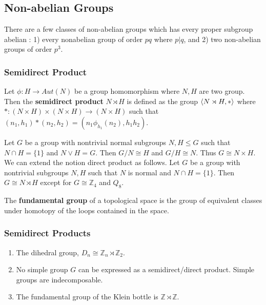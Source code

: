 \subsection{Non-abelian Groups}
	There are a few classes of non-abelian groups which has every proper subgroup abelian : 
	1) every nonabelian group of order $pq$ where $p|q$, and
	2) two non-abelian groups of order $p^3$.

\subsubsection{Semidirect Product}
\begin{definition}
	Let $\phi : H \to Aut(N)$ be a group homomorphism where $N,H$ are two group.
	Then the \textbf{semidirect product} $N \rtimes H$ is defined as the group $\left\langle N \rtimes H,\ast \right\rangle$ where $\ast : (N \times H) \times (N \times H) \to (N \times H)$ such that $(n_1,h_1) \ast (n_2,h_2) = (n_1 \phi_{h_1}(n_2),h_1h_2)$.
\end{definition}

	Let $G$ be a group with nontrivial normal subgroups $N,H \le G$ such that $N \cap H = \{ 1 \}$ and $N \vee H = G$. Then $G/N \cong H$ and $G/H \cong N$. Thus $G \cong N \times H$.\\

	We can extend the notion direct product as follows.
	Let $G$ be a group with nontrivial subgroups $N,H$ such that $N$ is normal and $N \cap H = \{ 1 \}$. Then $G \cong N \rtimes H$ except for $G \cong \mathbb{Z}_4$ and $Q_8$.
	
\begin{definition}
	The \textbf{fundamental group} of a topological space is the group of equivalent classes under homotopy of the loops contained in the space.
\end{definition}

\subsubsection{Semidirect Products}
\begin{enumerate}
	\item The dihedral group, $D_n \cong \mathbb{Z}_n \rtimes \mathbb{Z}_2$.
	\item No simple group $G$ can be expressed as a semidirect/direct product.
		\subitem Simple groups are indecomposable.
	\item The fundamental group of the Klein bottle is $\mathbb{Z} \rtimes \mathbb{Z}$.\\
\end{enumerate}


